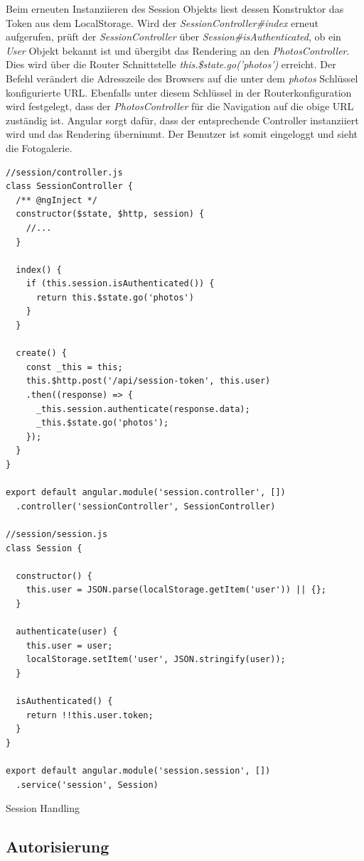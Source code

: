 Beim erneuten Instanziieren des Session Objekts liest dessen Konstruktor das Token aus dem LocalStorage. Wird der \textit{SessionController\#index} erneut aufgerufen, prüft der \textit{SessionController} über \textit{Session\#isAuthenticated}, ob ein \textit{User} Objekt bekannt ist und übergibt das Rendering an den \textit{PhotosController}. Dies wird über die Router Schnittstelle \textit{this.\$state.go('photos')} erreicht. Der Befehl verändert die Adresszeile des Browsers auf die unter dem  \textit{photos} Schlüssel konfigurierte URL. Ebenfalls unter diesem Schlüssel in der Routerkonfiguration
wird festgelegt, dass der \textit{PhotosController} für die Navigation auf die obige URL zuständig ist. Angular sorgt dafür, dass der entsprechende Controller instanziiert wird und das Rendering übernimmt. Der Benutzer ist somit eingeloggt und sieht die Fotogalerie.

\begin{listing}[H]
\begin{verbatim}
//session/controller.js
class SessionController {
  /** @ngInject */
  constructor($state, $http, session) {
    //...
  }

  index() {
    if (this.session.isAuthenticated()) {
      return this.$state.go('photos')
    }
  }

  create() {
    const _this = this;
    this.$http.post('/api/session-token', this.user)
    .then((response) => {
      _this.session.authenticate(response.data);
      _this.$state.go('photos');
    });
  }
}

export default angular.module('session.controller', [])
  .controller('sessionController', SessionController)

//session/session.js
class Session {

  constructor() {
    this.user = JSON.parse(localStorage.getItem('user')) || {};
  }

  authenticate(user) {
    this.user = user;
    localStorage.setItem('user', JSON.stringify(user));
  }

  isAuthenticated() {
    return !!this.user.token;
  }
}

export default angular.module('session.session', [])
  .service('session', Session)

\end{verbatim}
\caption{Session Handling}
\label{lst:session_handling}
\end{listing}

\subsection{Autorisierung}

